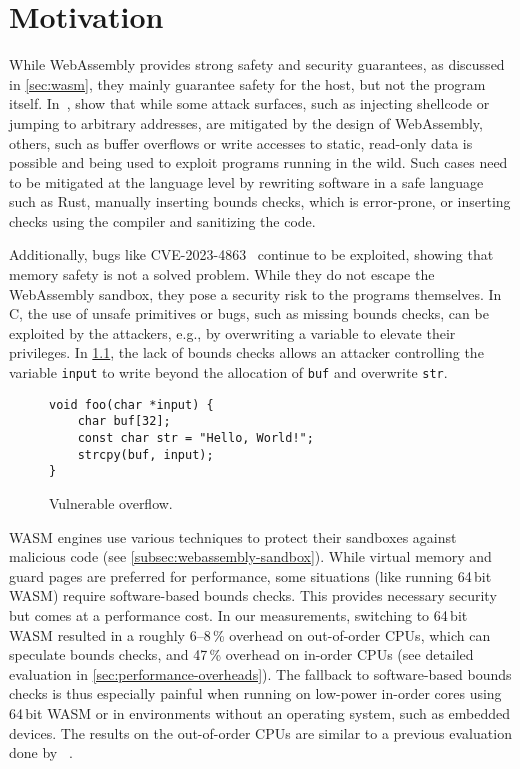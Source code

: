 \chapter{Motivation}
\label{ch:motivation}

While WebAssembly provides strong safety and security guarantees, as discussed in \cref{sec:wasm}, they mainly guarantee safety for the host, but not the program itself.
In~\cite{lehmann2020everything}, \citeauthor*{lehmann2020everything} show that while some attack surfaces, such as injecting shellcode or jumping to arbitrary addresses, are mitigated by the design of WebAssembly, others, such as buffer overflows or write accesses to static, read-only data is possible and being used to exploit programs running in the wild.
Such cases need to be mitigated at the language level by rewriting software in a safe language such as Rust, manually inserting bounds checks, which is error-prone, or inserting checks using the compiler and sanitizing the code.

Additionally, bugs like {CVE-2023-4863}~\cite{CVE-2023-4863} continue to be exploited, showing that memory safety is not a solved problem.
While they do not escape the WebAssembly sandbox, they pose a security risk to the programs themselves.
In C, the use of unsafe primitives or bugs, such as missing bounds checks, can be exploited by the attackers, e.g., by overwriting a variable to elevate their privileges.
In \cref{fig:vulnerable-overflow}, the lack of bounds checks allows an attacker controlling the variable \texttt{input} to write beyond the allocation of \texttt{buf} and overwrite \texttt{str}.

\begin{figure}[h]
    \centering
    \begin{lstlisting}[frame=h,style=customc,label={lst:vulnerable-overflow}]
void foo(char *input) {
    char buf[32];
    const char str = "Hello, World!";
    strcpy(buf, input);
}
    \end{lstlisting}
    \caption{Vulnerable overflow.}
    \label{fig:vulnerable-overflow}
\end{figure}

\Ac{WASM} engines use various techniques to protect their sandboxes against malicious code (see \cref{subsec:webassembly-sandbox}).
While virtual memory and guard pages are preferred for performance, some situations (like running 64\,bit \ac{WASM}) require software-based bounds checks.
This provides necessary security but comes at a performance cost.
In our measurements, switching to 64\,bit \ac{WASM} resulted in a roughly 6--8\,\% overhead on out-of-order CPUs, which can speculate bounds checks, and 47\,\% overhead on in-order CPUs (see detailed evaluation in \cref{sec:performance-overheads}).
The fallback to software-based bounds checks is thus especially painful when running on low-power in-order cores using 64\,bit \ac{WASM} or in environments without an operating system, such as embedded devices.
The results on the out-of-order CPUs are similar to a previous evaluation done by \citeauthor*{szewczyk2022leaps}~\cite{szewczyk2022leaps}.

